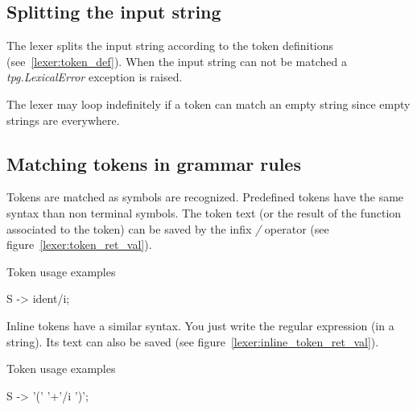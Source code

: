 \subsection{Splitting the input string}

The lexer splits the input string according to the token definitions (see~\ref{lexer:token_def}). When the input string can not be matched a \emph{tpg.LexicalError} exception is raised.

The lexer may loop indefinitely if a token can match an empty string since empty strings are everywhere.

\subsection{Matching tokens in grammar rules}

Tokens are matched as symbols are recognized.
Predefined tokens have the same syntax than non terminal symbols.
The token text (or the result of the function associated to the token) can be saved by the infix \emph{/} operator (see figure~\ref{lexer:token_ret_val}).

\begin{code}
\caption{Token usage examples}                              \label{lexer:token_ret_val}
\begin{verbatimtab}[4]
    S -> ident/i;
\end{verbatimtab}
\end{code}

Inline tokens have a similar syntax. You just write the regular expression (in a string). Its text can also be saved (see figure~\ref{lexer:inline_token_ret_val}).

\begin{code}
\caption{Token usage examples}                              \label{lexer:inline_token_ret_val}
\begin{verbatimtab}[4]
    S -> '(' '\w+'/i ')';
\end{verbatimtab}
\end{code}

